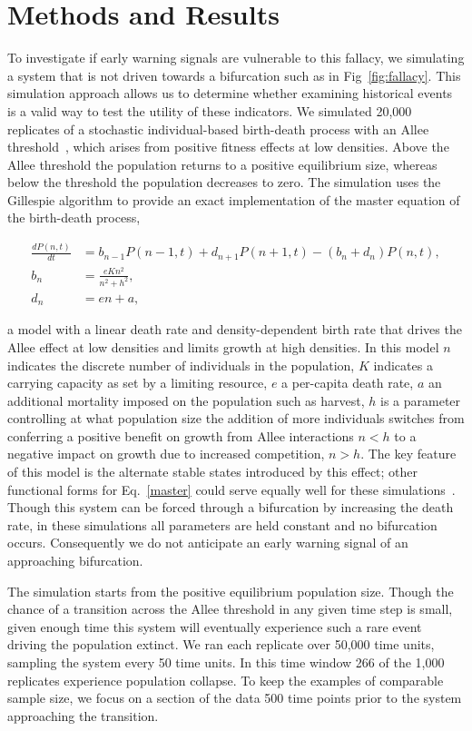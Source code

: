 \documentclass[authoryear,review,12pt]{elsarticle}
\begin{document}
\section{Methods and Results}
To investigate if early warning signals are vulnerable to this fallacy,
we simulating a system that is not driven towards a bifurcation such as
in Fig~\ref{fig:fallacy}.  This simulation approach allows us to determine whether
examining historical events is a valid way to test the utility of these
indicators.  We simulated 20,000 replicates of a stochastic individual-based
birth-death process with an Allee threshold~\citep{Courchamp2008}, which
arises from positive fitness effects at low densities.  Above the Allee
threshold the population returns to a positive equilibrium size, whereas
below the threshold the population decreases to zero. The
simulation uses the Gillespie algorithm to provide an exact implementation
of the master equation of the birth-death process,

\begin{align}
  \frac{dP(n,t)}{dt} &= b_{n-1} P(n-1,t) + d_{n+1}P(n+1,t) - (b_n+d_n) P(n,t)  \label{master}, \\
    b_n &= \frac{e K n^2}{n^2 + h^2}, \\
    d_n &= e n + a,
\end{align}

a model with a linear death rate and density-dependent birth
rate that drives the Allee effect at low densities and limits
growth at high densities.  In this model $n$ indicates the discrete
number of individuals in the population, $K$ indicates a carrying 
capacity as set by a limiting resource, $e$ a per-capita death rate, 
$a$ an additional mortality imposed on the population such as harvest,
$h$ is a parameter controlling at what population size the addition of 
more individuals switches from conferring a positive benefit on growth 
from Allee interactions $n < h$ to a negative impact on growth due to 
increased competition, $n > h$.  The key feature of this model is the
alternate stable states introduced by this effect; other functional
forms for Eq.~\eqref{master} could serve equally well for these
simulations~\citep[see \emph{e.g.}][]{Scheffer2001}.  Though this
system can be forced through a bifurcation by increasing
the death rate, in these simulations all parameters are held constant
and no bifurcation occurs.  Consequently we do not anticipate an early
warning signal of an approaching bifurcation.  

The simulation starts from the positive equilibrium population size.
Though the chance of a transition across the Allee threshold in any
given time step is small, given enough time this system will eventually
experience such a rare event driving the population extinct.  We ran
each replicate over 50,000 time units, sampling the system every 50
time units.  In this time window 266 of the 1,000 replicates experience
population collapse.  To keep the examples of comparable sample size,
we focus on a section of the data 500 time points prior to the system
approaching the transition.
\end{document}
